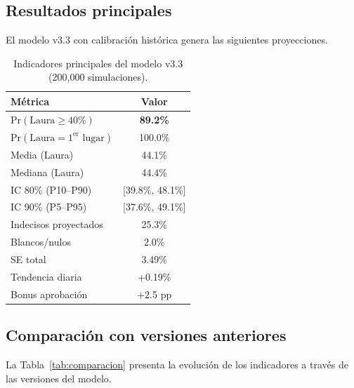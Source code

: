 \documentclass[11pt,a4paper]{article}
\newcommand{\prob}[1]{\text{Pr}(#1)}
\begin{document}
\subsection{Resultados principales}

El modelo v3.3 con calibración histórica genera las siguientes proyecciones.

\begin{table}[H]
\centering
\caption{Indicadores principales del modelo v3.3 (200,000 simulaciones).}
\label{tab:resultados_principales}
\begin{tabular}{@{}lc@{}}
\toprule
\textbf{Métrica} & \textbf{Valor} \\
\midrule
$\prob{\text{Laura} \geq 40\%}$ & \textbf{89.2\%} \\
$\prob{\text{Laura} = 1^{\text{er}} \text{ lugar}}$ & 100.0\% \\
\midrule
Media (Laura) & 44.1\% \\
Mediana (Laura) & 44.4\% \\
IC 80\% (P10--P90) & [39.8\%, 48.1\%] \\
IC 90\% (P5--P95) & [37.6\%, 49.1\%] \\
\midrule
Indecisos proyectados & 25.3\% \\
Blancos/nulos & 2.0\% \\
\midrule
SE total & 3.49\% \\
Tendencia diaria & +0.19\% \\
Bonus aprobación & +2.5 pp \\
\bottomrule
\end{tabular}
\end{table}

\subsection{Comparación con versiones anteriores}

La Tabla~\ref{tab:comparacion} presenta la evolución de los indicadores a través de las versiones del modelo.
\end{document}
